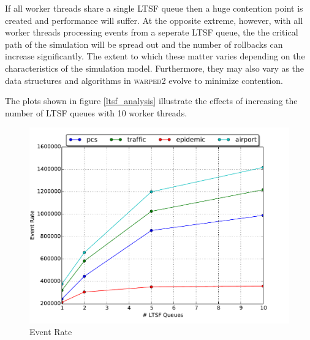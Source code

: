 \documentclass[11pt]{book}
\begin{document}
If all worker threads share a single LTSF queue then a huge contention point is created and
performance will suffer. At the opposite extreme, however, with all worker threads processing
events from a seperate LTSF queue, the the critical path of the simulation will be spread out
and the number of rollbacks can increase significantly. The extent to which these matter varies
depending on the characteristics of the simulation model. Furthermore, they may also vary as
the data structures and algorithms in \textsc{warped2} evolve to minimize contention.

The plots shown in figure \ref{ltsf_analysis} illustrate the effects of increasing the number
of LTSF queues with 10 worker threads.

\begin{figure}
  \begin{minipage}{.5\textwidth}
    \begin{center}
      \includegraphics[width=\textwidth,keepaspectratio,quiet]{figs/pending_event_set/ltsf_event_rate.pdf} \\
      Event Rate \\
    \end{center}
  \end{minipage}%
  \hfill
  \begin{minipage}{.5\textwidth}
    \begin{center}

\end{center}
\end{minipage}
\end{figure}
\end{document}
